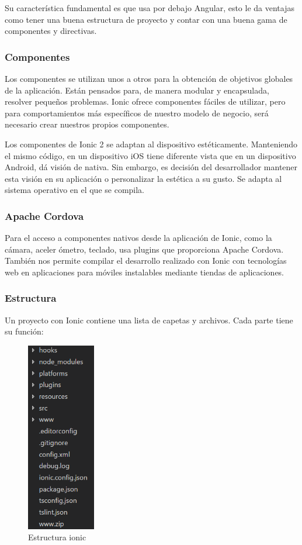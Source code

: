 \documentclass[a4paper, 12pt]{book}
\begin{document}
Su caracter\'istica fundamental es que usa por debajo Angular, esto le da ventajas como tener
una buena estructura de proyecto y contar con una buena gama de componentes y directivas.

\subsubsection{Componentes}
\label{subsec:estilo}

Los componentes se utilizan unos a otros para la obtenci\'on de objetivos globales de la aplicaci\'on. Est\'an pensados para, de manera modular y encapsulada, resolver peque\~nos problemas.
Ionic ofrece componentes f\'aciles de utilizar, pero para comportamientos m\'as espec\'ificos de
nuestro modelo de negocio, ser\'a necesario crear nuestros propios componentes.

Los componentes de Ionic 2 se adaptan al dispositivo est\'eticamente. Manteniendo el mismo
c\'odigo, en un dispositivo iOS tiene diferente vista que en un dispositivo Android, d\'a
visi\'on de nativa. Sin embargo, es decisi\'on del desarrollador mantener esta visi\'on en su aplicaci\'on o
personalizar la est\'etica a su gusto.
Se adapta al sistema operativo en el que se compila. 

\subsubsection{Apache Cordova}
\label{subsec:estilo}

Para el acceso a componentes nativos desde la aplicaci\'on de Ionic, como la c\'amara, aceler
\'ometro, teclado, usa plugins que proporciona Apache Cordova. Tambi\'en nos permite compilar
el desarrollo realizado con Ionic con tecnolog\'ias web en aplicaciones para m\'oviles instalables
mediante tiendas de aplicaciones.

\subsubsection{Estructura}
\label{subsec:estilo}

Un proyecto con Ionic contiene una lista de capetas y archivos. Cada parte tiene su funci\'on:

\begin{figure}[H]
  \centering
  \includegraphics[width=3cm, keepaspectratio]{img/estructura_ionic}
  \caption{Estructura ionic}
  \label{figura:estructura_ionic}
\end{figure}
\end{document}
